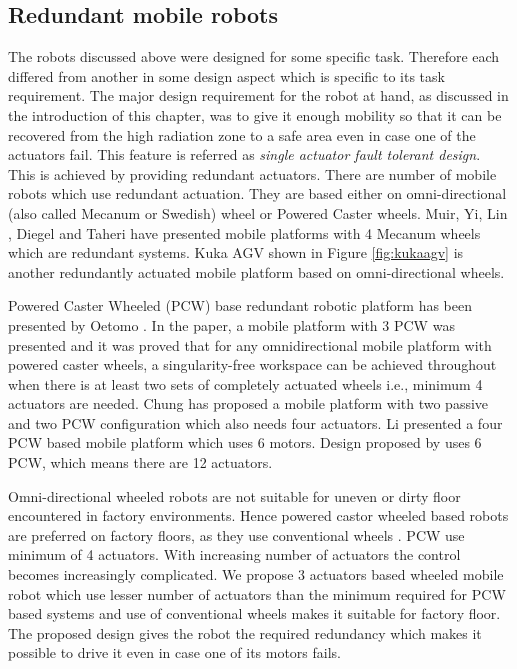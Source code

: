 \subsection{Redundant mobile robots}\label{sec:RudantrobotLit}
The robots discussed above were designed for some specific task. Therefore each differed from another in some design aspect which is specific to its task requirement. The major design requirement for the robot at hand, as discussed in the introduction of this chapter, was to give it enough mobility so that it can be recovered from the high radiation zone to a safe area even in case one of the actuators fail. This feature is referred as \textit{single actuator fault tolerant design}. This  is achieved by providing redundant actuators. There are number  of mobile robots which use redundant actuation. They are based either on omni-directional (also called Mecanum or Swedish) wheel or Powered Caster wheels.  Muir\cite{muir1987kinematic}, Yi\cite{yi2002kinematics}, Lin \cite{lin2013modeling}, Diegel \cite{diegel2002improved} and Taheri \cite{taheri2015kinematic} have presented mobile platforms with 4 Mecanum wheels  which are redundant systems. Kuka AGV shown in Figure \ref{fig:kukaagv} is another redundantly actuated mobile platform based on omni-directional wheels. 

 
 Powered Caster Wheeled (PCW) base redundant robotic platform has been presented by Oetomo \cite{oetomo2008singularity}. In the paper, a mobile platform with 3 PCW was presented and it was proved that for any omnidirectional  mobile platform with powered caster wheels, a singularity-free  workspace can be achieved throughout when there is at least two  sets of completely actuated wheels i.e., minimum 4 actuators are needed. Chung \cite{chung2010design} has proposed  a mobile platform with two passive and two PCW configuration which also needs four actuators.  Li \cite{li2006wheel} presented a four PCW based mobile platform which uses 6 motors. Design proposed by \cite{witus2000mobility, moore2000modelling} uses 6 PCW, which means there are 12 actuators.
 
    Omni-directional wheeled robots are not suitable for uneven or dirty floor encountered in factory environments. Hence powered castor wheeled based robots are preferred on factory floors, as they use conventional wheels \cite{park2002optimal}. PCW use minimum of 4 actuators. With increasing number of actuators the control becomes increasingly complicated. We propose 3 actuators based wheeled mobile robot which use lesser number of actuators than the minimum required for PCW based systems and use of conventional wheels  makes it suitable for factory floor. The proposed design gives the robot the required redundancy which makes it possible to drive it even in case one of its motors fails.     



